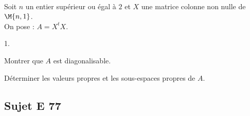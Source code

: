 \documentclass[11pt]{article}%
\begin{document}

\begin{exerciceSP}~\\
  Soit $n$ un entier supérieur ou égal à $2$ et $X$ une matrice
  colonne non nulle de $\M{n,1}$.\\
  On pose : $A=X ^t X$.
  \begin{noliste}{1.}
    \setlength{\itemsep}{2mm}
  \item Montrer que $A$ est diagonalisable.
  \item Déterminer les valeurs propres et les sous-espaces propres de
    $A$.
  \end{noliste}
\end{exerciceSP}


\newpage

\subsection*{Sujet E 77}

\end{document}
